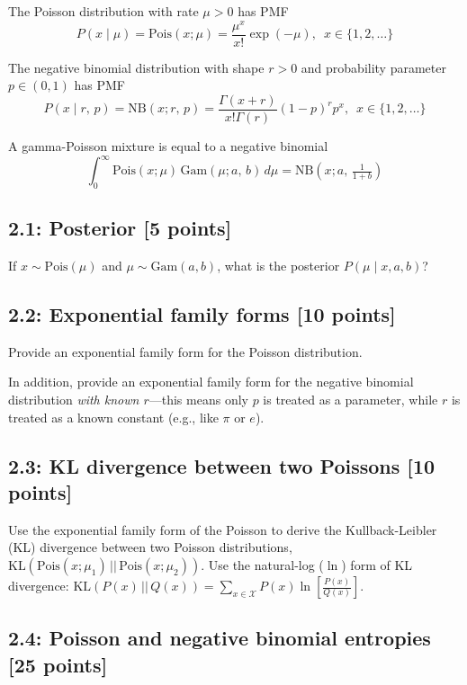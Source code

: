 \documentclass{article}
\begin{document}
The Poisson distribution with rate $\mu>0$ has PMF
\begin{equation}
P(x \mid \mu) = \textrm{Pois}(x; \mu) = \frac{\mu^x}{x!} \exp(-\mu), \,\,\, x \in \{1,2,\dots\}
\end{equation}

The negative binomial distribution with shape $r>0$ and probability parameter $p \in (0,1)$ has PMF
\begin{equation}
P(x \mid r,\, p) = \textrm{NB}(x; r,\, p) = \frac{\Gamma(x+r)}{x! \Gamma(r)} (1-p)^r p^x, \,\,\, x \in \{1,2,\dots\}
\end{equation}

A gamma-Poisson mixture is equal to a negative binomial
\begin{equation}
\int_{0}^\infty \textrm{Pois}(x; \mu) \,\textrm{Gam}(\mu; a,\,b) \,d\mu = \textrm{NB}(x; a,\, \tfrac{1}{1+b})
\end{equation}

\subsection*{2.1: Posterior [5 points]}
If $x \sim \textrm{Pois}(\mu)$ and $\mu \sim \textrm{Gam}(a, b)$, what is the posterior $P(\mu \mid x, a, b)$?

\subsection*{2.2: Exponential family forms [10 points]} 
Provide an exponential family form for the Poisson distribution.

In addition, provide an exponential family form for the negative binomial distribution \textit{with known $r$}---this means only $p$ is treated as a parameter, while $r$ is treated as a known constant (e.g., like $\pi$ or $e$).

\subsection*{2.3: KL divergence between two Poissons [10 points]} Use the exponential family form of the Poisson to derive the Kullback-Leibler (KL) divergence between two Poisson distributions, $\textrm{KL}(\textrm{Pois}(x; \mu_1) \,||\, \textrm{Pois}(x; \mu_2))$. Use the natural-log ($\ln$) form of KL divergence: 
$\textrm{KL}(P(x) \,||\, Q(x)) = \sum_{x \in \mathcal{X}} P(x) \ln\left[\frac{P(x)}{Q(x)}\right]$.

\subsection*{2.4: Poisson and negative binomial entropies [25 points]}
\end{document}
